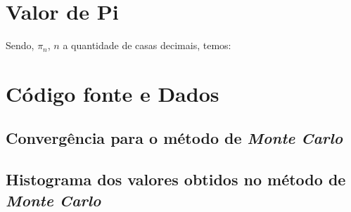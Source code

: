 \begin{appendixenv}[Apêndices]
    \section{Valor de Pi} \label{apx:pi-number}

    Sendo, $\pi_n$, $n$ a quantidade de casas decimais, temos:

    

    \cleardoublepage
    \section{Código fonte e Dados} \label{apx:source-code}

    \subsection{Convergência para o método de \textit{Monte Carlo}}
    \label{sec:convergence_coding_at_monte_carlo}
    
    
    
    \newpage
    
    \subsection{Histograma dos valores obtidos no método de \textit{Monte Carlo}}
    \label{sec:histogram_coding_at_monte_carlo}
    
    
    
    \newpage
    
    \end{appendixenv}